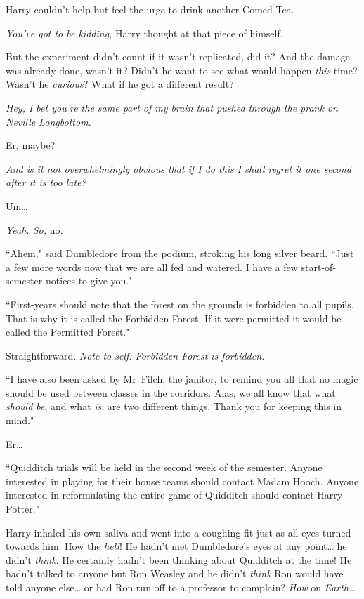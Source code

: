 Harry couldn't help but feel the urge to drink another Comed-Tea.

\emph{You've \emph{got} to be kidding,} Harry thought at that piece of himself.

But the experiment didn't count if it wasn't replicated, did it? And the damage was already done, wasn't it? Didn't he want to see what would happen \emph{this} time? Wasn't he \emph{curious}? What if he got a different result?

\emph{Hey, I bet you're the same part of my brain that pushed through the prank on Neville Longbottom.}

Er, maybe?

\emph{And is it not \emph{overwhelmingly} obvious that if I do this I shall regret it one second after it is too late?}

Um{\ldots}

\emph{Yeah. So,} no\emph{.}

``Ahem," said Dumbledore from the podium, stroking his long silver beard. ``Just a few more words now that we are all fed and watered. I have a few start-of-semester notices to give you."

``First-years should note that the forest on the grounds is forbidden to all pupils. That is why it is called the Forbidden Forest. If it were permitted it would be called the Permitted Forest."

Straightforward. \emph{Note to self: Forbidden Forest is forbidden.}

``I have also been asked by Mr~Filch, the janitor, to remind you all that no magic should be used between classes in the corridors. Alas, we all know that what \emph{should be}, and what \emph{is}, are two different things. Thank you for keeping this in mind."

Er{\ldots}

``Quidditch trials will be held in the second week of the semester. Anyone interested in playing for their house teams should contact Madam Hooch. Anyone interested in reformulating the entire game of Quidditch should contact Harry Potter."

Harry inhaled his own saliva and went into a coughing fit just as all eyes turned towards him. How the \emph{hell}! He hadn't met Dumbledore's eyes at any point{\ldots} he didn't \emph{think}. He certainly hadn't been thinking about Quidditch at the time! He hadn't talked to anyone but Ron Weasley and he didn't \emph{think} Ron would have told anyone else{\ldots} or had Ron run off to a professor to complain? \emph{How} on \emph{Earth{\ldots}}

